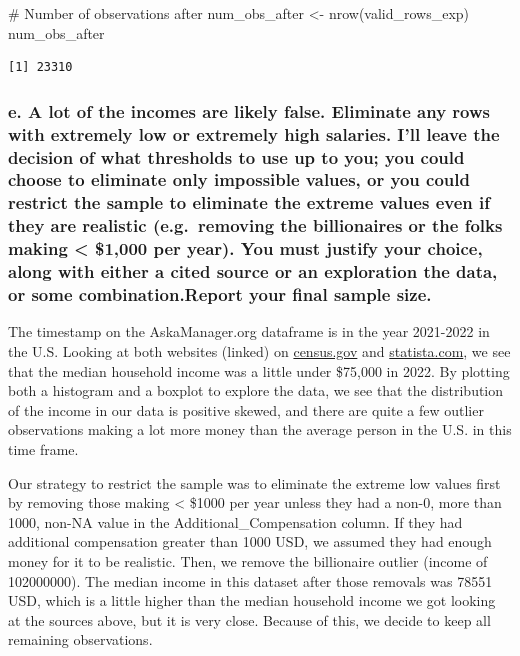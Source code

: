 \documentclass[
  letterpaper,
  DIV=11,
  numbers=noendperiod]{scrartcl}
\newenvironment{Shaded}{\begin{snugshade}}{\end{snugshade}}
\newcommand{\CommentTok}[1]{\textcolor[rgb]{0.37,0.37,0.37}{#1}}
\newcommand{\FunctionTok}[1]{\textcolor[rgb]{0.28,0.35,0.67}{#1}}
\newcommand{\NormalTok}[1]{\textcolor[rgb]{0.00,0.23,0.31}{#1}}
\newcommand{\OtherTok}[1]{\textcolor[rgb]{0.00,0.23,0.31}{#1}}
\begin{document}
\begin{Shaded}
\begin{Highlighting}[]
\CommentTok{\# Number of observations after}
\NormalTok{num\_obs\_after }\OtherTok{\textless{}{-}} \FunctionTok{nrow}\NormalTok{(valid\_rows\_exp)}
\NormalTok{num\_obs\_after}
\end{Highlighting}
\end{Shaded}

\begin{verbatim}
[1] 23310
\end{verbatim}

\subsubsection{e. A lot of the incomes are likely false. Eliminate any
rows with extremely low or extremely high salaries. I'll leave the
decision of what thresholds to use up to you; you could choose to
eliminate only impossible values, or you could restrict the sample to
eliminate the extreme values even if they are realistic (e.g.~removing
the billionaires or the folks making \textless{} \$1,000 per year). You
must justify your choice, along with either a cited source or an
exploration the data, or some combination.Report your final sample
size.}\label{e.-a-lot-of-the-incomes-are-likely-false.-eliminate-any-rows-with-extremely-low-or-extremely-high-salaries.-ill-leave-the-decision-of-what-thresholds-to-use-up-to-you-you-could-choose-to-eliminate-only-impossible-values-or-you-could-restrict-the-sample-to-eliminate-the-extreme-values-even-if-they-are-realistic-e.g.-removing-the-billionaires-or-the-folks-making-1000-per-year.-you-must-justify-your-choice-along-with-either-a-cited-source-or-an-exploration-the-data-or-some-combination.report-your-final-sample-size.}

The timestamp on the AskaManager.org dataframe is in the year 2021-2022
in the U.S. Looking at both websites (linked) on
\href{https://www.census.gov/library/publications/2023/demo/p60-279.html}{census.gov}
and
\href{https://www.statista.com/statistics/203183/percentage-distribution-of-household-income-in-the-us/}{statista.com},
we see that the median household income was a little under \$75,000 in
2022. By plotting both a histogram and a boxplot to explore the data, we
see that the distribution of the income in our data is positive skewed,
and there are quite a few outlier observations making a lot more money
than the average person in the U.S. in this time frame.

Our strategy to restrict the sample was to eliminate the extreme low
values first by removing those making \textless{} \$1000 per year unless
they had a non-0, more than 1000, non-NA value in the
Additional\_Compensation column. If they had additional compensation
greater than 1000 USD, we assumed they had enough money for it to be
realistic. Then, we remove the billionaire outlier (income of
102000000). The median income in this dataset after those removals was
78551 USD, which is a little higher than the median household income we
got looking at the sources above, but it is very close. Because of this,
we decide to keep all remaining observations.
\end{document}
